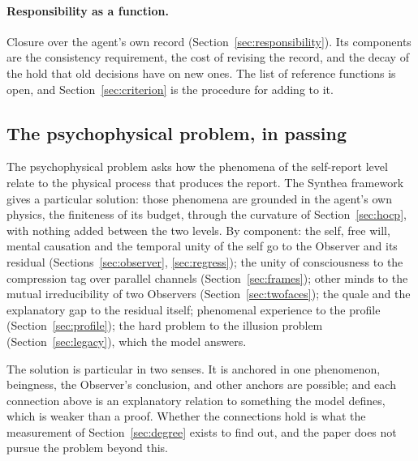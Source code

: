 \paragraph{Responsibility as a function.}
Closure over the agent's own record (Section~\ref{sec:responsibility}). Its components are the
consistency requirement, the cost of revising the record, and the decay of the hold that old decisions
have on new ones. The list of reference functions is open, and Section~\ref{sec:criterion} is the
procedure for adding to it.

\subsection{The psychophysical problem, in passing}
\label{sec:psychophysical}

The psychophysical problem asks how the phenomena of the self-report level relate to the physical
process that produces the report. The Synthea framework gives a particular solution: those phenomena are
grounded in the agent's own physics, the finiteness of its budget, through the curvature of
Section~\ref{sec:hocp}, with nothing added between the two levels. By component: the self, free will,
mental causation and the temporal unity of the self go to the Observer and its residual
(Sections~\ref{sec:observer}, \ref{sec:regress}); the unity of consciousness to the compression tag
over parallel channels (Section~\ref{sec:frames}); other minds to the mutual irreducibility of two
Observers (Section~\ref{sec:twofaces}); the quale and the explanatory gap to the residual itself;
phenomenal experience to the profile (Section~\ref{sec:profile}); the hard problem to the illusion
problem (Section~\ref{sec:legacy}), which the model answers.

The solution is particular in two senses. It is anchored in one phenomenon, beingness, the Observer's
conclusion, and other anchors are possible; and each connection above is an explanatory relation to
something the model defines, which is weaker than a proof. Whether the connections hold is what the
measurement of Section~\ref{sec:degree} exists to find out, and the paper does not pursue the problem
beyond this.

